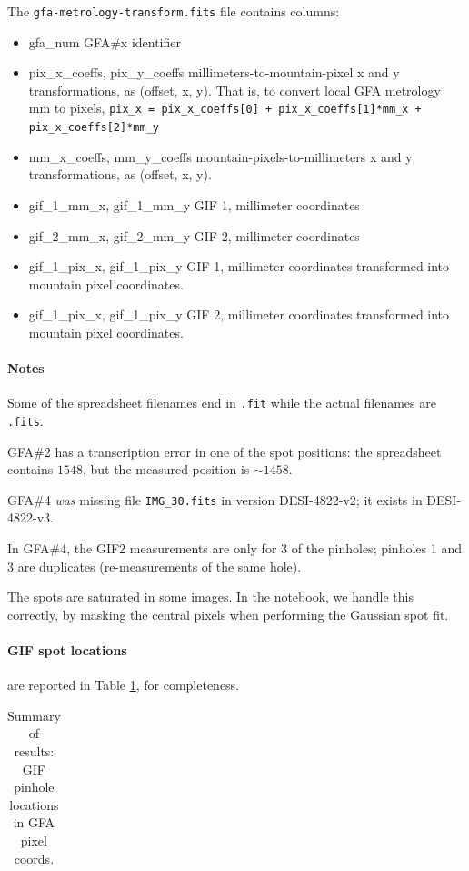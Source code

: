 \documentclass[10pt]{article}
\newcommand{\code}[1]{\texttt{#1}}
\begin{document}
The \code{gfa-metrology-transform.fits} file contains columns:
\begin{itemize}
\item{gfa\_num} GFA\#x identifier
\item{pix\_x\_coeffs, pix\_y\_coeffs} millimeters-to-mountain-pixel x and y transformations, as (offset, x, y).
  That is, to convert local GFA metrology mm to pixels, \code{pix\_x = pix\_x\_coeffs[0] + pix\_x\_coeffs[1]*mm\_x + pix\_x\_coeffs[2]*mm\_y}
\item{mm\_x\_coeffs, mm\_y\_coeffs} mountain-pixels-to-millimeters x and y transformations, as (offset, x, y).
\item{gif\_1\_mm\_x, gif\_1\_mm\_y} GIF 1, millimeter coordinates
\item{gif\_2\_mm\_x, gif\_2\_mm\_y} GIF 2, millimeter coordinates
\item{gif\_1\_pix\_x, gif\_1\_pix\_y} GIF 1, millimeter coordinates transformed
  into mountain pixel coordinates.
\item{gif\_1\_pix\_x, gif\_1\_pix\_y} GIF 2, millimeter coordinates transformed
  into mountain pixel coordinates.
\end{itemize}


\paragraph{Notes}

Some of the spreadsheet filenames end in \code{.fit} while the actual
filenames are \code{.fits}.

GFA\#2 has a transcription error in one of the spot positions: the
spreadsheet contains $1548$, but the measured position is $\sim 1458$.

GFA\#4 \emph{was} missing file \code{IMG\_30.fits} in version
DESI-4822-v2; it exists in DESI-4822-v3.

In GFA\#4, the GIF2 measurements are only for 3 of the pinholes;
pinholes 1 and 3 are duplicates (re-measurements of the same hole).

The spots are saturated in some images.  In the notebook, we handle this correctly, by masking the central pixels
when performing the Gaussian spot fit.


\paragraph{GIF spot locations} are reported in Table \ref{tab:pinholes},
for completeness.

\begin{table}
  \begin{center}
    \begin{footnotesize}
    \begin{tabular}{|ccc|c|c|}
      \hline
      
    \end{tabular}
    \end{footnotesize}
  \end{center}
  \caption{Summary of results: GIF pinhole locations in GFA pixel coords.
  \label{tab:pinholes}}
\end{table}
\end{document}
